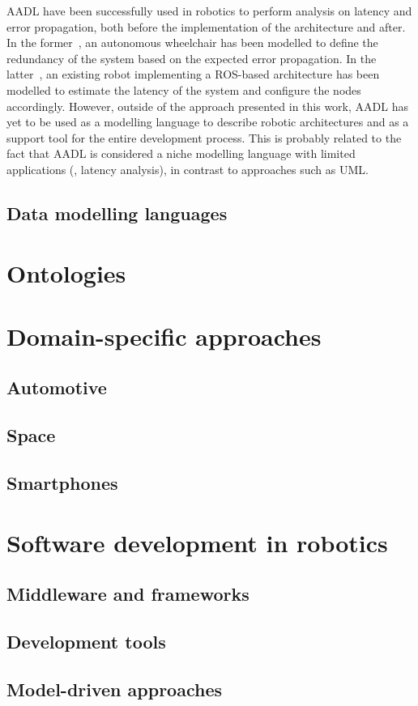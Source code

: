 AADL have been successfully used in robotics to perform analysis on latency and error propagation, both before the implementation of the architecture and after. In the former~\cite{biggs2014modelling}, an autonomous wheelchair has been modelled to define the redundancy of the system based on the expected error propagation. In the latter~\cite{larsen2016modelling}, an existing robot implementing a ROS-based architecture has been modelled to estimate the latency of the system and configure the nodes accordingly. However, outside of the approach presented in this work, AADL has yet to be used as a modelling language to describe robotic architectures and as a support tool for the entire development process. This is probably related to the fact that AADL is considered a niche modelling language with limited applications (\eg, latency analysis), in contrast to approaches such as UML.

\subsection{Data modelling languages}

\section{Ontologies}

\section{Domain-specific approaches}

\subsection{Automotive}
\subsection{Space}
\subsection{Smartphones}

\section{Software development in robotics}

\subsection{Middleware and frameworks}
\subsection{Development tools}
\subsection{Model-driven approaches}

